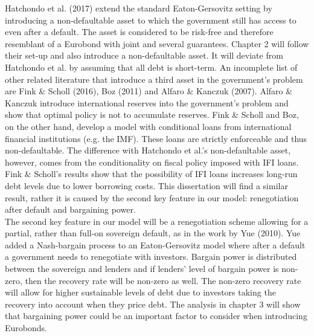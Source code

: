 Hatchondo et al. (2017) extend the standard Eaton-Gersovitz setting by introducing a non-defaultable asset to which the government still has access to even after a default. The asset is considered to be risk-free and therefore resemblant of a Eurobond with joint and several guarantees. Chapter 2 will follow their set-up and also introduce a non-defaultable asset. It will deviate from Hatchondo et al. by assuming that all debt is short-term. An incomplete list of other related literature that introduce a third asset in the government's problem are Fink \& Scholl (2016), Boz (2011) and Alfaro \& Kanczuk (2007). Alfaro \& Kanczuk introduce international reserves into the government's problem and show that optimal policy is not to accumulate reserves. Fink \& Scholl and Boz, on the other hand, develop a model with conditional loans from international financial institutions (e.g. the IMF). These loans are strictly enforceable and thus non-defaultable. The difference with Hatchondo et al.'s non-defaultable asset, however, comes from the conditionality on fiscal policy imposed with IFI loans. Fink \& Scholl's results show that the possibility of IFI loans increases long-run debt levels due to lower borrowing costs. This dissertation will find a similar result, rather it is caused by the second key feature in our model: renegotiation after default and bargaining power.\\

The second key feature in our model will be a renegotiation scheme allowing for a partial, rather than full-on sovereign default, as in the work by Yue (2010). Yue added a Nash-bargain process to an Eaton-Gersovitz model where after a default a government needs to renegotiate with investors. Bargain power is distributed between the sovereign and lenders and if lenders' level of bargain power is non-zero, then the recovery rate will be non-zero as well. The non-zero recovery rate will allow for higher sustainable levels of debt due to investors taking the recovery into account when they price debt. The analysis in chapter 3 will show that bargaining power could be an important factor to consider when introducing Eurobonds.\\